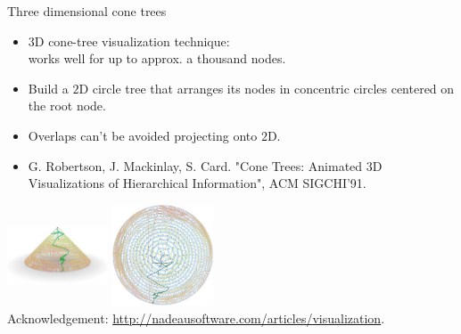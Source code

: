 \documentclass[aspectratio=169,t]{beamer}
\begin{document}
  { 
    \begin{frame}{Three dimensional cone trees}
    \centering
    \begin{itemize}
      \item $3$D cone-tree visualization technique:\\
            works well for up to approx. a thousand nodes.
      \item Build a $2$D circle tree that arranges its nodes in concentric circles centered on the root node.
      \item Overlaps can't be avoided projecting onto $2$D.
      \item G. Robertson, J. Mackinlay, S. Card. "Cone Trees: Animated 3D Visualizations of Hierarchical Information", ACM SIGCHI'91.
    \end{itemize}
    \vspace{0.2cm}
    \includegraphics[width=3cm,height=3cm]{img/threedcone_one.jpg}\hspace{1cm}
    \includegraphics[width=3cm,height=3cm]{img/threedcone_two.jpg}\\
    \tiny{Acknowledgement: \href{ttp://nadeausoftware.com/articles/visualization}{http://nadeausoftware.com/articles/visualization}.}
    \end{frame}
  }
\end{document}
